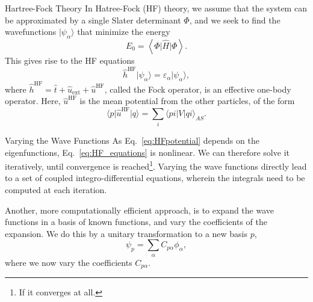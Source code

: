 \documentclass[UKenglish,aspectratio=169]{beamer}
\begin{document}
\begin{frame}{Hartree-Fock Theory}
    In Hatree-Fock (HF) theory, we assume that the system can be
    approximated by a single Slater determinant $\Phi$, and we seek
    to find the wavefunctions $\lvert \psi_\alpha \rangle$ that
    minimize the energy
    \begin{equation}
        E_0 = \left\langle \Phi \vert \hat{H} \vert \Phi \right\rangle.
    \end{equation}
    This gives rise to the HF equations
    \begin{equation}\label{eq:HF_equations}
        \hat{h}^\mathrm{HF} \lvert \psi_\alpha \rangle =
        \varepsilon_\alpha \lvert \psi_\alpha \rangle,
    \end{equation}
    where $\hat{h}^\mathrm{HF} = \hat{t} + \hat{u}_{\mathrm{ext}} +
    \hat{u}^\mathrm{HF}$, called the Fock operator, is an effective
    one-body operator.
    Here, $\hat{u}^\mathrm{HF}$ is the mean potential from the other
    particles, of the form
    \begin{equation}\label{eq:HFpotential}
        \langle p \vert \hat{u}^\mathrm{HF} \vert q \rangle =
        \sum_{i} \langle pi \vert V \vert qi \rangle_{AS}.
    \end{equation}
\end{frame}

\begin{frame}{Varying the Wave Functions}
    As Eq.~\eqref{eq:HFpotential} depends on the eigenfunctions,
    Eq.~\eqref{eq:HF_equations} is nonlinear.
    We can therefore solve it iteratively, until convergence is
    reached\footnote{If it converges at all.}.
    Varying the wave functions directly lead to a set of coupled
    integro-differential equations, wherein the integrals need to be
    computed at each iteration.

    \bigskip

    Another, more computationally efficient approach, is to expand
    the wave functions in a basis of known functions, and vary the
    coefficients of the expansion.
    We do this by a unitary transformation to a new basis $p$,
    \begin{equation}
        \psi_p = \sum_{\alpha} C_{p\alpha} \phi_\alpha,
    \end{equation}
    where we now vary the coefficients $C_{p\alpha}$.
\end{frame}
\end{document}
